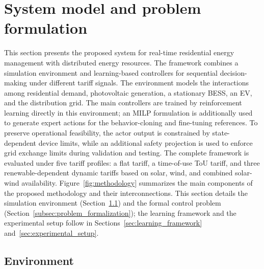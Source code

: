 \documentclass[preprint,12pt, 3p]{elsarticle}
\begin{document}



\section{System model and problem formulation}
\label{sec:system_model}

This section presents the proposed system for real-time residential energy management with distributed energy resources. The framework combines a simulation environment and learning-based controllers for sequential decision-making under different tariff signals. The environment models the interactions among residential demand, photovoltaic generation, a stationary \gls{BESS}, an \gls{EV}, and the distribution grid. The main controllers are trained by reinforcement learning directly in this environment; an \gls{MILP} formulation is additionally used to generate expert actions for the behavior-cloning and fine-tuning references. To preserve operational feasibility, the actor output is constrained by state-dependent device limits, while an additional safety projection is used to enforce grid exchange limits during validation and testing. The complete framework is evaluated under five tariff profiles: a flat tariff, a time-of-use \gls{ToU} tariff, and three renewable-dependent dynamic tariffs based on solar, wind, and combined solar-wind availability. Figure~\ref{fig:methodology} summarizes the main components of the proposed methodology and their interconnections. This section details the simulation environment (Section~\ref{subsec:environment}) and the formal control problem (Section~\ref{subsec:problem_formalization}); the learning framework and the experimental setup follow in Sections~\ref{sec:learning_framework} and~\ref{sec:experimental_setup}.



\subsection{Environment}\label{subsec:environment}
\end{document}
